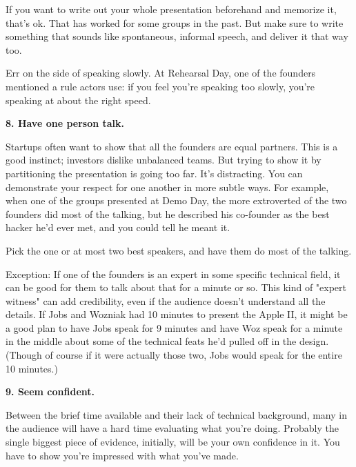 If
                    you want to write out your whole presentation beforehand and
                    memorize it, that's ok. That has worked for some groups in
                    the past. But make sure to write something that sounds like
                    spontaneous, informal speech, and deliver it that way
                    too.

Err on the side of speaking slowly. At
                    Rehearsal Day, one of the founders mentioned a rule actors
                    use: if you feel you're speaking too slowly, you're speaking
                    at about the right speed.

\textbf{8. Have one person talk.}

Startups often want to show that all the
                    founders are equal partners. This is a good instinct;
                    investors dislike unbalanced teams. But trying to show it by
                    partitioning the presentation is going too far. It's
                    distracting. You can demonstrate your respect for one
                    another in more subtle ways. For example, when one of the
                    groups presented at Demo Day, the more extroverted of the
                    two founders did most of the talking, but he described his
                    co-founder as the best hacker he'd ever met, and you could
                    tell he meant it.

Pick the one or at most two
                    best speakers, and have them do most of the talking.

Exception:
                    If one of the founders is an expert in some specific
                    technical field, it can be good for them to talk about that
                    for a minute or so. This kind of "expert witness" can add
                    credibility, even if the audience doesn't understand all the
                    details. If Jobs and Wozniak had 10 minutes to present the
                    Apple II, it might be a good plan to have Jobs speak for 9
                    minutes and have Woz speak for a minute in the middle about
                    some of the technical feats he'd pulled off in the design.
                    (Though of course if it were actually those two, Jobs would
                    speak for the entire 10 minutes.)

\textbf{9. Seem confident.}

Between the brief time available and their lack
                    of technical background, many in the audience will have a
                    hard time evaluating what you're doing. Probably the single
                    biggest piece of evidence, initially, will be your own
                    confidence in it. You have to show you're impressed with
                    what you've made.

